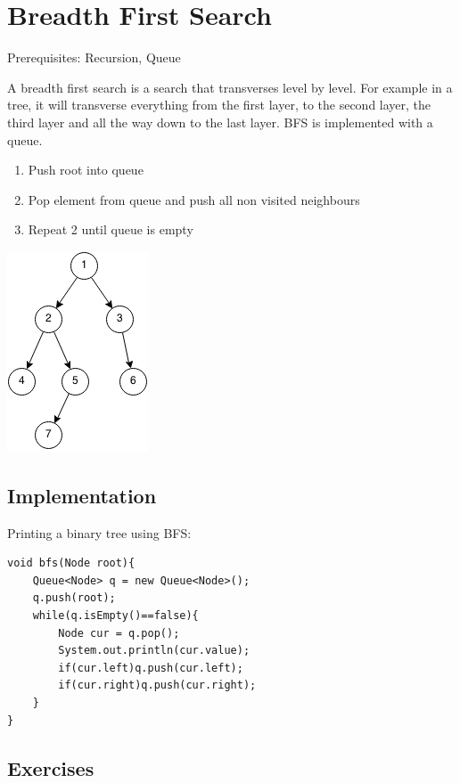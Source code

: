 \documentclass[11pt,oneside]{book}
\makeatletter
\def\maxwidth#1{\ifdim\Gin@nat@width>#1 #1\else\Gin@nat@width\fi}
\makeatother
\begin{document}
        \section{ Breadth First Search }
        

Prerequisites: Recursion, Queue

A breadth first search is a search that transverses level by level. For example in a tree, it will transverse everything from the first layer, to the second layer, the third layer and all the way down to the last layer. BFS is implemented with a queue.

\begin{enumerate}
\item Push root into queue
\item Pop element from queue and push all non visited neighbours
\item Repeat 2 until queue is empty
\end{enumerate}

\vspace{5px}\includegraphics[width=\maxwidth{\textwidth}]{bfs.png}

\subsection{Implementation}

Printing a binary tree using BFS:

\begin{lstlisting}
void bfs(Node root){
    Queue<Node> q = new Queue<Node>();
    q.push(root);
    while(q.isEmpty()==false){
        Node cur = q.pop();
        System.out.println(cur.value);
        if(cur.left)q.push(cur.left);
        if(cur.right)q.push(cur.right);
    }
}
\end{lstlisting}

\subsection{Exercises}
\end{document}
